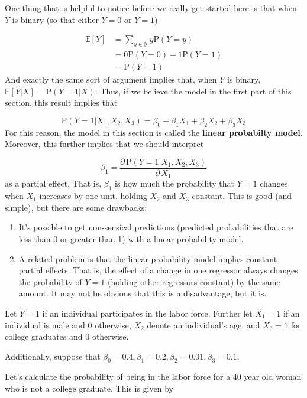 \documentclass[
  letterpaper,
  DIV=11,
  numbers=noendperiod]{scrreprt}
\begin{document}
One thing that is helpful to notice before we really get started here is
that when \(Y\) is binary (so that either \(Y=0\) or \(Y=1\))

\[
  \begin{aligned}
  \mathbb{E}[Y] &= \sum_{y \in \mathcal{Y}} y \mathrm{P}(Y=y) \\
  &= 0 \mathrm{P}(Y=0) + 1 \mathrm{P}(Y=1) \\
  &= \mathrm{P}(Y=1)
  \end{aligned}
\] And exactly the same sort of argument implies that, when \(Y\) is
binary, \(\mathbb{E}[Y|X] = \mathrm{P}(Y=1|X)\). Thus, if we believe the
model in the first part of this section, this result implies that

\[
  \mathrm{P}(Y=1|X_1,X_2,X_3) = \beta_0 + \beta_1 X_1 + \beta_2 X_2 + \beta_3 X_3
\] For this reason, the model in this section is called the
\textbf{linear probabilty model}. Moreover, this further implies that we
should interpret

\[
  \beta_1 = \frac{\partial \, \mathrm{P}(Y=1|X_1,X_2,X_3)}{\partial \, X_1}
\] as a partial effect. That is, \(\beta_1\) is how much the probability
that \(Y=1\) changes when \(X_1\) increases by one unit, holding \(X_2\)
and \(X_3\) constant. This is good (and simple), but there are some
drawbacks:

\begin{enumerate}
\def\labelenumi{\arabic{enumi}.}
\item
  It's possible to get non-sensical predictions (predicted probabilities
  that are less than 0 or greater than 1) with a linear probability
  model.
\item
  A related problem is that the linear probability model implies
  constant partial effects. That is, the effect of a change in one
  regressor always changes the probability of \(Y=1\) (holding other
  regressors constant) by the same amount. It may not be obvious that
  this is a disadvantage, but it is.
\end{enumerate}

Let \(Y=1\) if an individual participates in the labor force. Further
let \(X_1=1\) if an individual is male and 0 otherwise, \(X_2\) denote
an individual's age, and \(X_3=1\) for college graduates and 0
otherwise.

Additionally, suppose that
\(\beta_0=0.4, \beta_1=0.2, \beta_2=0.01, \beta_3=0.1\).

Let's calculate the probability of being in the labor force for a 40
year old woman who is not a college graduate. This is given by
\end{document}
